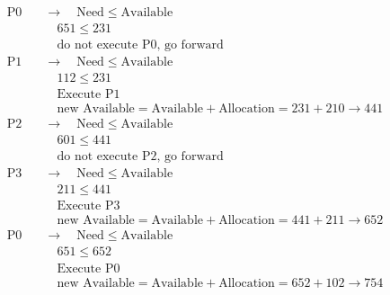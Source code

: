 \documentclass[12pt]{article}
\begin{document}
\begin{align*}
    \text{P0} \quad & \rightarrow \quad \text{Need} \leq \text{Available} \\
                    & \quad 651 \leq 231 \\
                    & \quad \text{do not execute P0, go forward} \\
    \text{P1} \quad & \rightarrow \quad \text{Need} \leq \text{Available} \\
                    & \quad 112 \leq 231 \\
                    & \quad \text{Execute P1} \\
                    & \quad \text{new Available} = \text{Available} + \text{Allocation} = 231 + 210 \rightarrow 441 \\
    \text{P2} \quad & \rightarrow \quad \text{Need} \leq \text{Available} \\
                    & \quad 601 \leq 441 \\
                    & \quad \text{do not execute P2, go forward} \\
    \text{P3} \quad & \rightarrow \quad \text{Need} \leq \text{Available} \\
                    & \quad 211 \leq 441 \\
                    & \quad \text{Execute P3} \\
                    & \quad \text{new Available} = \text{Available} + \text{Allocation} = 441 + 211 \rightarrow 652 \\
    \text{P0} \quad & \rightarrow \quad \text{Need} \leq \text{Available} \\
                    & \quad 651 \leq 652 \\
                    & \quad \text{Execute P0} \\
                    & \quad \text{new Available} = \text{Available} + \text{Allocation} = 652 + 102 \rightarrow 754
\end{align*}
\end{document}
